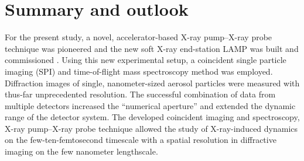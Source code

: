 \chapter{Summary and outlook}\label{ch:summary_outlook}
For the present study, a novel, accelerator-based X-ray pump--X-ray probe technique was pioneered \citep{Lutman-2013-PRL} and the new soft X-ray end-station LAMP was built and commissioned \citep{Ferguson-2015-JSR}. Using this new experimental setup, a coincident single particle imaging (SPI) and time-of-flight mass spectroscopy method was employed. Diffraction images of single, nanometer-sized aerosol particles were measured with thus-far unprecedented resolution. The successful combination of data from multiple detectors increased the ``numerical aperture'' and extended the dynamic range of the detector system. The developed coincident imaging and spectroscopy, X-ray pump--X-ray probe technique allowed the study of X-ray-induced dynamics on the few-ten-femtosecond timescale with a spatial resolution in diffractive imaging on the few nanometer lengthscale.\\[1\baselineskip]
%

